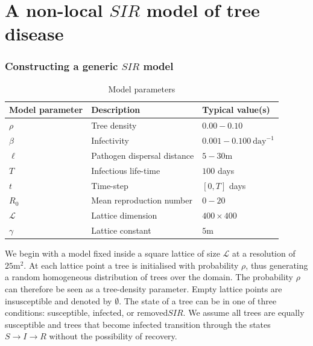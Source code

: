 \chapter{A non-local $SIR$ model of tree disease}

\blindtext

\blindtext

\subsection{Constructing a generic $SIR$ model} %
\label{section:sgm-expo}
\begin{table}[h]
\centering
\begin{tabular}{l l l}
\hline
\textbf{Model parameter} & \textbf{Description} & \textbf{Typical value(s)}\\
\hline
$\rho$  & Tree density & $0.00 - 0.10$ \\ 
$\beta$ & Infectivity & $0.001 - 0.100\ \mathrm{day}^{-1}$ \\
$\ell$ & Pathogen dispersal distance & $5-30\mathrm{m}$ \\
$T$ & Infectious life-time & $100$ days \\
$t$ & Time-step & $[0, T]$ days\\
$R_0$ & Mean reproduction number & $0-20$ \\
$\mathcal{L}$ & Lattice dimension & $400\times400$ \\
$\gamma$ & Lattice constant & $5\mathrm{m}$ \\
\hline
\end{tabular}
\caption{Model parameters}
\end{table}

We begin with a model fixed inside a square lattice of size $\mathcal{L}$ at a resolution of $\mathrm{25m^2}$. At each lattice point a tree is initialised with probability $\rho$, thus generating a random homogeneous distribution of trees over the domain. The probability $\rho$ can therefore be seen as a tree-density parameter. Empty lattice points are insusceptible and denoted by $\emptyset$. The state of a tree can be in one of three conditions: susceptible, infected, or removed\textemdash $SIR$. We assume all trees are equally susceptible and trees that become infected transition through the states $S\rightarrow I\rightarrow R$ without the possibility of recovery.\\

